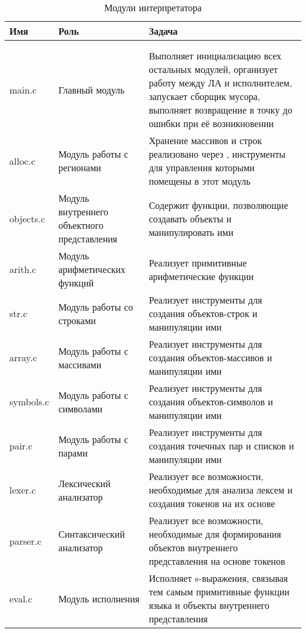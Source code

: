 \begin{xltabular}{\textwidth}{|l|p{4cm}|X|}
	\caption{Модули интерпретатора\label{modules:table}} \\ \hline
	\centrow Имя & \centrow Роль & \centrow Задача \\ \hline
	 &  &  \\ \hline
	\endfirsthead
	 &  &  \\ \hline
	\finishhead
	main.c & Главный модуль & Выполняет инициализацию всех остальных модулей, организует работу между ЛА и исполнителем, запускает сборщик мусора, выполняет возвращение в точку до ошибки при её возникновении \\ \hline
	alloc.c & Модуль работы с регионами & Хранение массивов и строк реализовано через , инструменты для управления которыми помещены в этот модуль \\ \hline
	objects.c & Модуль внутреннего объектного представления & Содержит функции, позволяющие создавать объекты и манипулировать ими \\ \hline
	arith.c & Модуль арифметических функций & Реализует примитивные арифметические функции \\ \hline
	str.c & Модуль работы со строками & Реализует инструменты для создания объектов-строк и манипуляции ими \\ \hline
	array.c & Модуль работы с массивами & Реализует инструменты для создания объектов-массивов и манипуляции ими \\ \hline
	symbols.c & Модуль работы с символами & Реализует инструменты для создания объектов-символов и манипуляции ими \\ \hline
	pair.c & Модуль работы с парами & Реализует инструменты для создания точечных пар и списков и манипуляции ими \\ \hline
	lexer.c & Лексический анализатор & Реализует все возможности, необходимые для анализа лексем и создания токенов на их основе \\ \hline
	parser.c & Синтаксический анализатор & Реализует все возможности, необходимые для формирования объектов внутреннего представления на основе токенов \\ \hline
	eval.c & Модуль исполнения & Исполняет s-выражения, связывая тем самым примитивные функции языка и объекты внутреннего представления \\ \hline
\end{xltabular}

